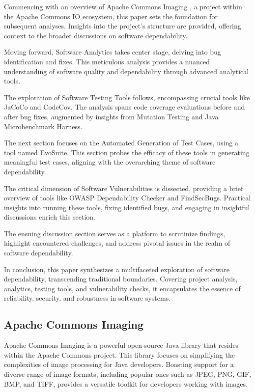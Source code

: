 \documentclass[sigconf]{acmart}
\begin{document}
Commencing with an overview of Apache Commons Imaging \cite{apache-commons-imaging}, a project within the Apache Commons IO ecosystem, this paper sets the foundation for subsequent analyses. Insights into the project's structure are provided, offering context to the broader discussions on software dependability.

Moving forward, Software Analytics takes center stage, delving into bug identification and fixes. This meticulous analysis provides a nuanced understanding of software quality and dependability through advanced analytical tools.

The exploration of Software Testing Tools follows, encompassing crucial tools like JaCoCo and CodeCov. The analysis spans code coverage evaluations before and after bug fixes, augmented by insights from Mutation Testing and Java Microbenchmark Harness.

The next section focuses on the Automated Generation of Test Cases, using a tool named EvoSuite. This section probes the efficacy of these tools in generating meaningful test cases, aligning with the overarching theme of software dependability.

The critical dimension of Software Vulnerabilities is dissected, providing a brief overview of tools like OWASP Dependability Checker and FindSecBugs. Practical insights into running these tools, fixing identified bugs, and engaging in insightful discussions enrich this section.

The ensuing discussion section serves as a platform to scrutinize findings, highlight encountered challenges, and address pivotal issues in the realm of software dependability.

In conclusion, this paper synthesizes a multifaceted exploration of software dependability, transcending traditional boundaries. Covering project analysis, analytics, testing tools, and vulnerability checks, it encapsulates the essence of reliability, security, and robustness in software systems.

\subsection{Apache Commons Imaging}
Apache Commons Imaging is a powerful open-source Java library that resides within the Apache Commons project. This library focuses on simplifying the complexities of image processing for Java developers. Boasting support for a diverse range of image formats, including popular ones such as JPEG, PNG, GIF, BMP, and TIFF, provides a versatile toolkit for developers working with images.
\end{document}
